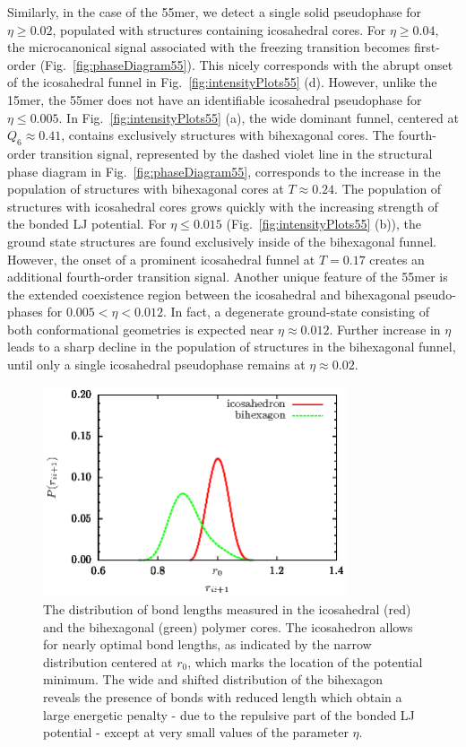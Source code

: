 \documentclass[12pt]{report}
\begin{document}
%
Similarly, in the case of the 55mer, we detect a single solid pseudophase for $\eta \geq 0.02$, populated with structures containing icosahedral cores. For $\eta \geq 0.04$, the microcanonical signal associated with the freezing transition becomes first-order (Fig.~\ref{fig:phaseDiagram55}). This nicely corresponds with the abrupt onset of the icosahedral funnel in Fig.~\ref{fig:intensityPlots55} (d). However, unlike the 15mer, the 55mer does not have an identifiable icosahedral pseudophase for $\eta \leq 0.005$. In Fig.~\ref{fig:intensityPlots55} (a), the wide dominant funnel, centered at $Q_{6}\approx 0.41$, contains exclusively structures with bihexagonal cores. The fourth-order transition signal, represented by the dashed violet line in the structural phase diagram in Fig.~\ref{fig:phaseDiagram55}, corresponds to the increase in the population of structures with bihexagonal cores at $T \approx 0.24$. The population of structures with icosahedral cores grows quickly with the increasing strength of the bonded LJ potential. For $\eta \leq 0.015$ (Fig.~\ref{fig:intensityPlots55} (b)), the ground state structures are found exclusively inside of the bihexagonal funnel. However, the onset of a prominent icosahedral funnel at $T = 0.17$ creates an additional fourth-order transition signal. Another unique feature of the 55mer is the extended coexistence region between the icosahedral and bihexagonal pseudo-phases for $ 0.005< \eta < 0.012$. In fact, a degenerate ground-state consisting of both conformational geometries is expected near $\eta \approx 0.012$. Further increase in $\eta$ leads to a sharp decline in the population of structures in the bihexagonal funnel, until only a single icosahedral pseudophase remains at $\eta \approx 0.02$. 
%

\begin{figure}
\center
\includegraphics[width=0.8\textwidth]{chapter6Figs/bondDistribution.eps}
	\caption{\label{fig:bondDistribution} The distribution of bond lengths measured in the icosahedral (red) and the bihexagonal (green) polymer cores. The icosahedron allows for nearly optimal bond lengths, as indicated by the narrow distribution centered at $r_{0}$, which marks the location of the potential minimum. The wide and shifted distribution of the bihexagon reveals the presence of bonds with reduced length which obtain a large energetic penalty - due to the repulsive part of the bonded LJ potential - except at very small values of the parameter $\eta$.}
\end{figure}
%
\end{document}
